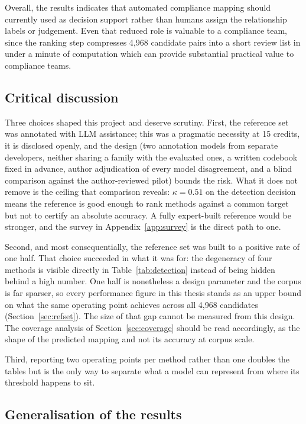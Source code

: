Overall, the results indicates that automated compliance mapping should currently used as decision
support rather than humans assign the relationship labels or judgement. Even that reduced role is valuable to a compliance team, since the ranking step compresses 4{,}968 candidate pairs into a short review list in under
a minute of computation which can provide substantial practical value to compliance teams.

\subsection*{Critical discussion}

Three choices shaped this project and deserve scrutiny. First, the reference set
was annotated with LLM assistance; this was a pragmatic necessity at 15 credits,
it is disclosed openly, and the design (two annotation models from separate
developers, neither sharing a family with the evaluated ones, a written codebook
fixed in advance, author adjudication of every model disagreement, and a blind
comparison against the author-reviewed pilot) bounds the risk. What it does not remove is
the ceiling that comparison reveals: $\kappa = 0.51$ on the detection decision
means the reference is good enough to rank methods against a common target but
not to certify an absolute accuracy. A fully expert-built reference would be
stronger, and the survey in Appendix~\ref{app:survey} is the direct path to one.

Second, and most consequentially, the reference set was built to a positive rate
of one half. That choice succeeded in what it was for: the degeneracy of four
methods is visible directly in Table~\ref{tab:detection} instead of being hidden
behind a high number. One half is nonetheless a design parameter and the corpus is
far sparser, so every performance figure in this thesis stands as an upper bound
on what the same operating point achieves across all 4{,}968 candidates
(Section~\ref{sec:refset}). The size of that gap cannot be measured from this
design. The coverage analysis of Section~\ref{sec:coverage} should be read
accordingly, as the shape of the predicted mapping and not its accuracy at corpus
scale.

Third, reporting two operating points per method rather than one doubles the
tables but is the only way to separate what a model can represent from where its
threshold happens to sit.

\subsection*{Generalisation of the results}

